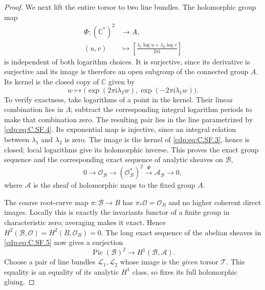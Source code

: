 \begin{proof}
We next lift the entire torsor to two
line bundles. The holomorphic group map
\[
 \begin{split}
 \Phi:(\mathbb C^*)^2&\longrightarrow A,\\
 (u,v)&\longmapsto
 \left[\frac{\lambda_1\log u+\lambda_2\log v}{2\pi\mathrm i}
                                                    \right]
 \end{split}
                                                               \tag{C.SF.3}\label{cdp:eq:C.SF.3}
\]
is independent of both logarithm choices.
It is surjective, since its derivative
is surjective and its image is therefore
an open subgroup of the connected group
$A$. Its kernel is the closed copy of
$\mathbb C$ given by
\[
 w\longmapsto
 \bigl(\exp(2\pi\mathrm i\lambda_2w),
                  \exp(-2\pi\mathrm i\lambda_1w)\bigr).
                                                               \tag{C.SF.4}\label{cdp:eq:C.SF.4}
\]
To verify exactness, take logarithms of
a point in the kernel. Their linear
combination lies in $\Lambda$; subtract
the corresponding integral logarithm
periods to make that combination zero.
The resulting pair lies in the line
parametrized by \eqref{cdp:eq:C.SF.4}. Its exponential
map is injective, since an integral
relation between $\lambda_1$ and
$\lambda_2$ is zero. The image is the
kernel of \eqref{cdp:eq:C.SF.3}, hence is closed;
local logarithms give its holomorphic
inverse. This proves the exact group
sequence and the corresponding exact
sequence of analytic sheaves on
$\mathcal B$,
\[
 0\longrightarrow\mathcal O_{\mathcal B}
   \longrightarrow(\mathcal O_{\mathcal B}^*)^2
   \xrightarrow{\Phi}\mathcal A_{\mathcal B}
   \longrightarrow0,
                                                               \tag{C.SF.5}\label{cdp:eq:C.SF.5}
\]
where $\mathcal A$ is the sheaf of
holomorphic maps to the fixed group $A$.

The coarse root-curve map
$\pi:\mathcal B\to B$ has
$\pi_*\mathcal O=\mathcal O_B$ and
no higher coherent direct images.
Locally this is exactly the invariants
functor of a finite group in characteristic
zero; averaging makes it exact. Hence
$H^2(\mathcal B,\mathcal O)=H^2(B,\mathcal O_B)=0$.
The long exact sequence of the abelian
sheaves in \eqref{cdp:eq:C.SF.5} now gives a surjection
\[
 \operatorname{Pic}(\mathcal B)^2
                 \longrightarrow H^1(\mathcal B,\mathcal A).
                                                               \tag{C.SF.6}\label{cdp:eq:C.SF.6}
\]
Choose a pair of line bundles
$\mathcal L_1,\mathcal L_2$ whose
image is the \emph{given} torsor
$\mathcal T$. This equality is an
equality of its analytic $H^1$ class,
so fixes its full holomorphic gluing.


\end{proof}
